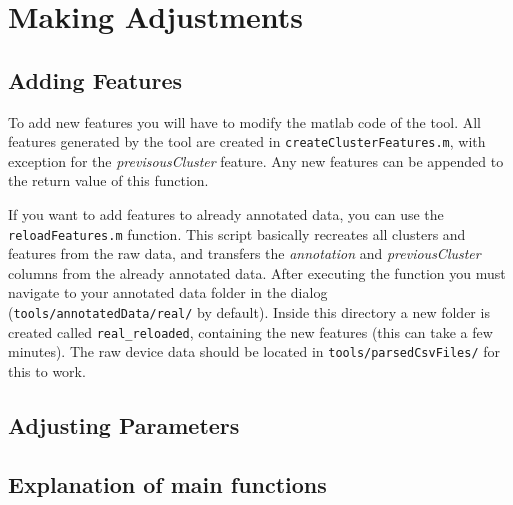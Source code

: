 \documentclass[a4paper, 11pt]{article}
\begin{document}
\section{Making Adjustments}

\subsection{Adding Features}

To add new features you will have to modify the matlab code of the tool. All features generated by the tool are created in \verb|createClusterFeatures.m|, with exception for the \emph{previsousCluster} feature. Any new features can be appended to the return value of this function. 

If you want to add features to already annotated data, you can use the \verb|reloadFeatures.m| function. This script basically recreates all clusters and features from the raw data, and transfers the \emph{annotation} and \emph{previousCluster} columns from the already annotated data. After executing the function you must navigate to your annotated data folder in the dialog (\verb|tools/annotatedData/real/| by default). Inside this directory a new folder is created called \verb|real_reloaded|, containing the new features (this can take a few minutes). The raw device data should be located in \verb|tools/parsedCsvFiles/| for this to work.

\subsection{Adjusting Parameters}

\subsection{Explanation of main functions}
\end{document}
